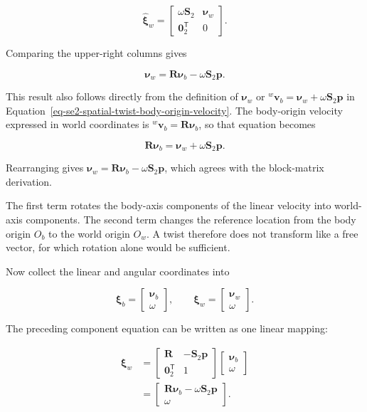 \documentclass[
  australian,
  12pt,
  letterpaper,
  DIV=11,
  numbers=noendperiod,
  twoside]{scrreprt}
\begin{document}
\[
\widehat{\boldsymbol\xi}_w
=
\begin{bmatrix}
\omega\mathbf S_2&\boldsymbol\nu_w\\
\mathbf 0_2^\mathsf T&0
\end{bmatrix}.
\]

Comparing the upper-right columns gives

\[
\boxed{
\boldsymbol\nu_w
=
\mathbf R\boldsymbol\nu_b
-
\omega\mathbf S_2\mathbf p
}.
\]

This result also follows directly from the definition of
\(\boldsymbol\nu_w\) or
\({}^w\mathbf v_b=\boldsymbol\nu_w+\omega\mathbf S_2\mathbf p\) in
Equation~\ref{eq-se2-spatial-twist-body-origin-velocity}. The
body-origin velocity expressed in world coordinates is
\({}^w\mathbf v_b=\mathbf R\boldsymbol\nu_b\), so that equation becomes

\[
\mathbf R\boldsymbol\nu_b
=
\boldsymbol\nu_w
+
\omega\mathbf S_2\mathbf p.
\]

Rearranging gives
\(\boldsymbol\nu_w=\mathbf R\boldsymbol\nu_b-\omega\mathbf S_2\mathbf p\),
which agrees with the block-matrix derivation.

The first term rotates the body-axis components of the linear velocity
into world-axis components. The second term changes the reference
location from the body origin \(O_b\) to the world origin \(O_w\). A
twist therefore does not transform like a free vector, for which
rotation alone would be sufficient.

Now collect the linear and angular coordinates into

\[
\boldsymbol\xi_b
=
\begin{bmatrix}
\boldsymbol\nu_b\\
\omega
\end{bmatrix},
\qquad
\boldsymbol\xi_w
=
\begin{bmatrix}
\boldsymbol\nu_w\\
\omega
\end{bmatrix}.
\]

The preceding component equation can be written as one linear mapping:

\[
\begin{aligned}
\boldsymbol\xi_w
&=
\begin{bmatrix}
\mathbf R&-\mathbf S_2\mathbf p\\
\mathbf 0_2^\mathsf T&1
\end{bmatrix}
\begin{bmatrix}
\boldsymbol\nu_b\\
\omega
\end{bmatrix}\\
&=
\begin{bmatrix}
\mathbf R\boldsymbol\nu_b-\omega\mathbf S_2\mathbf p\\
\omega
\end{bmatrix}.
\end{aligned}
\]
\end{document}
